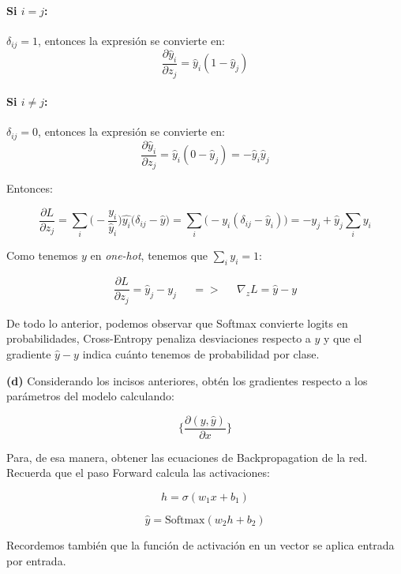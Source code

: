 \paragraph*{Si $i=j$:}
$\delta_{ij}=1$, entonces la expresión se convierte en:
\[
\frac{\partial \hat{y}_i}{\partial z_j} = \hat{y}_i(1 - \hat{y}_j)
\]

\paragraph*{Si $i \neq j$:}
$\delta_{ij}=0$, entonces la expresión se convierte en:
\[
\frac{\partial \hat{y}_i}{\partial z_j} = \hat{y}_i(0 - \hat{y}_j) = -\hat{y}_i \hat{y}_j
\]

Entonces:

\[
    \frac{\partial L}{\partial z_j} = \sum_{i} \big(- \frac{y_i}{\hat{y}_i}\big) \hat{y_i} \big(\delta_{ij} - \hat{y}\big) = \sum_{i} \big(-y_i (\delta_{ij} - \hat{y}_i)\big) = -y_j + \hat{y}_j \sum_{i} y_i
\]

Como tenemos $y$ en \textit{one-hot}, tenemos que $\sum_{i} y_i = 1$:

\[
    \frac{\partial L}{\partial z_j} = \hat{y}_j - y_j \;\;\;\;\; => \;\;\;\;\; \nabla_z L = \hat{y} - y
\]


De todo lo anterior, podemos observar que Softmax convierte logits en probabilidades, Cross-Entropy penaliza
desviaciones respecto a $y$ y que el gradiente $\hat{y} - y$ indica cuánto tenemos de probabilidad por clase. 



\begin{myblock}
    
    \textbf{(d)} Considerando los incisos anteriores, obtén los gradientes respecto a los parámetros del
    modelo calculando:

    \[
        \bigg\{\frac{\partial (y, \hat{y})}{\partial x} \bigg\}
    \]

    Para, de esa manera, obtener las ecuaciones de Backpropagation de la red. Recuerda que el paso Forward
    calcula las activaciones:

    \[
        h = \sigma(w_1 x + b_1)
    \]

    \[
        \hat{y} = \text{Softmax}(w_2 h + b_2)
    \]

    Recordemos también que la función de activación en un vector se aplica entrada por entrada. 
\end{myblock}


